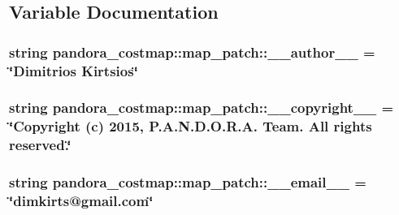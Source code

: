 \subsection{\-Variable \-Documentation}
\hypertarget{namespacepandora__costmap_1_1map__patch_a5af51e1537bbd62f25822677d0e6244d}{
\subsubsection[{\-\_\-\-\_\-author\-\_\-\-\_\-}]{\setlength{\rightskip}{0pt plus 5cm}string {\bf pandora\-\_\-costmap\-::map\-\_\-patch\-::\-\_\-\-\_\-author\-\_\-\-\_\-} = \char`\"{}\-Dimitrios \-Kirtsios\char`\"{}}}\label{namespacepandora__costmap_1_1map__patch_a5af51e1537bbd62f25822677d0e6244d}
\hypertarget{namespacepandora__costmap_1_1map__patch_a6a55417f0934cc0539529746c24ae999}{
\subsubsection[{\-\_\-\-\_\-copyright\-\_\-\-\_\-}]{\setlength{\rightskip}{0pt plus 5cm}string {\bf pandora\-\_\-costmap\-::map\-\_\-patch\-::\-\_\-\-\_\-copyright\-\_\-\-\_\-} = \char`\"{}\-Copyright (c) 2015, \-P.\-A.\-N.\-D.\-O.\-R.\-A. \-Team. \-All rights reserved.\char`\"{}}}\label{namespacepandora__costmap_1_1map__patch_a6a55417f0934cc0539529746c24ae999}
\hypertarget{namespacepandora__costmap_1_1map__patch_af48dc6761ae32cedff0b215160aeff83}{
\subsubsection[{\-\_\-\-\_\-email\-\_\-\-\_\-}]{\setlength{\rightskip}{0pt plus 5cm}string {\bf pandora\-\_\-costmap\-::map\-\_\-patch\-::\-\_\-\-\_\-email\-\_\-\-\_\-} = \char`\"{}dimkirts@gmail.\-com\char`\"{}}}\label{namespacepandora__costmap_1_1map__patch_af48dc6761ae32cedff0b215160aeff83}
